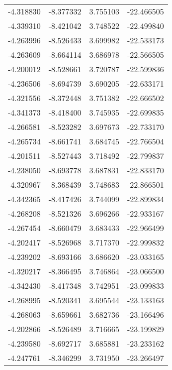 \begin{tabular}{rrrr}
       -4.318830 &        -8.377332 &    3.755103 & -22.466505 \\
       -4.339310 &        -8.421042 &    3.748522 & -22.499840 \\
       -4.263996 &        -8.526433 &    3.699982 & -22.533173 \\
       -4.263609 &        -8.664114 &    3.686978 & -22.566505 \\
       -4.200012 &        -8.528661 &    3.720787 & -22.599836 \\
       -4.236506 &        -8.694739 &    3.690205 & -22.633171 \\
       -4.321556 &        -8.372448 &    3.751382 & -22.666502 \\
       -4.341373 &        -8.418400 &    3.745935 & -22.699835 \\
       -4.266581 &        -8.523282 &    3.697673 & -22.733170 \\
       -4.265734 &        -8.661741 &    3.684745 & -22.766504 \\
       -4.201511 &        -8.527443 &    3.718492 & -22.799837 \\
       -4.238050 &        -8.693778 &    3.687831 & -22.833170 \\
       -4.320967 &        -8.368439 &    3.748683 & -22.866501 \\
       -4.342365 &        -8.417426 &    3.744099 & -22.899834 \\
       -4.268208 &        -8.521326 &    3.696266 & -22.933167 \\
       -4.267454 &        -8.660479 &    3.683433 & -22.966499 \\
       -4.202417 &        -8.526968 &    3.717370 & -22.999832 \\
       -4.239202 &        -8.693166 &    3.686620 & -23.033165 \\
       -4.320217 &        -8.366495 &    3.746864 & -23.066500 \\
       -4.342430 &        -8.417348 &    3.742951 & -23.099833 \\
       -4.268995 &        -8.520341 &    3.695544 & -23.133163 \\
       -4.268063 &        -8.659661 &    3.682736 & -23.166496 \\
       -4.202866 &        -8.526489 &    3.716665 & -23.199829 \\
       -4.239580 &        -8.692717 &    3.685881 & -23.233162 \\
       -4.247761 &        -8.346299 &    3.731950 & -23.266497 \\

\end{tabular}
